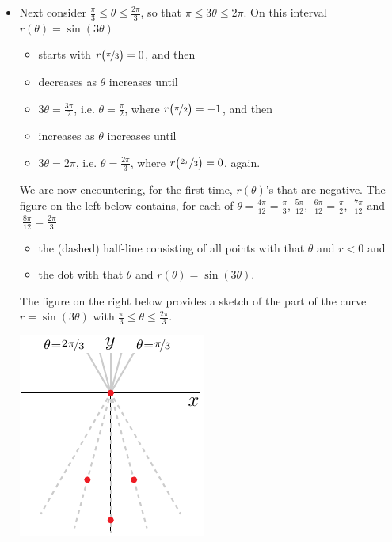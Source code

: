 \begin{eg}
\begin{itemize}
\item 
Next consider $\frac{\pi}{3}\le\theta\le\frac{2\pi}{3}$, so that
$\pi\le 3\theta \le 2\pi$. On this interval $r(\theta)=\sin(3\theta)$
   \begin{itemize}\itemsep1pt \parskip0pt 
        \item
          starts with $r\big(\nicefrac{\pi}{3}\big)=0$, and then
        \item
          decreases as $\theta$ increases until
        \item
         $3\theta=\frac{3\pi}{2}$, i.e. $\theta=\frac{\pi}{2}$,
          where $r\big(\nicefrac{\pi}{2}\big)=-1$, and then
        \item
          increases as $\theta$ increases until
        \item
         $3\theta=2\pi$, i.e. $\theta=\frac{2\pi}{3}$,
          where $r\big(\nicefrac{2\pi}{3}\big)=0$, again.
   \end{itemize}  
We are now encountering, for the first time, $r(\theta)$'s that are negative.
The figure on the left below contains, for each of 
$\theta = \frac{4\pi}{12}=\frac{\pi}{3}$, $\frac{5\pi}{12}$, 
$\ \frac{6\pi}{12}=\frac{\pi}{2}$, $\ \frac{7\pi}{12}$ and 
$\ \frac{8\pi}{12}=\frac{2\pi}{3}$
   \begin{itemize}\itemsep1pt \parskip0pt 
        \item
          the (dashed) half-line consisting of all points with that 
           $\theta$ and $r<0$ and
        \item
           the dot with that $\theta$ and $r(\theta)=\sin(3\theta)$.      
   \end{itemize} 
The figure on the right below provides a sketch of the
part of the curve $r=\sin(3\theta)$ with 
$\frac{\pi}{3}\le \theta\le \frac{2\pi}{3}$. 
\begin{efig}
\begin{center}
    \includegraphics{rose2.pdf}\qquad\qquad

\end{center}
\end{efig}
\end{itemize}
\end{eg}
